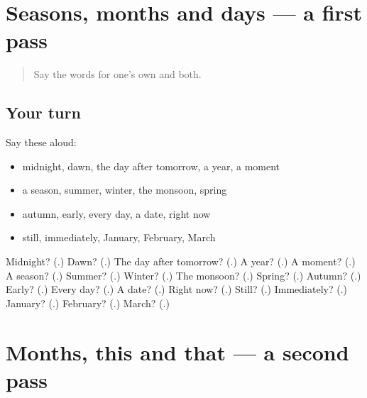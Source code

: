 \section[(dialogue)]{Seasons, months and days — a first pass}

\label{lesson:GU-R100-first-pass-seasons-months-and-days}



\begin{quote}
Say the words for one's own and both.
\end{quote}

\subsection*{Your turn}
Say these aloud:

\begin{itemize}
\raggedright
  \item midnight, dawn, the day after tomorrow, a year, a moment
  \item a season, summer, winter, the monsoon, spring
  \item autumn, early, every day, a date, right now
  \item still, immediately, January, February, March
\end{itemize}

\begin{tcolorbox}[breakable,colback=teal!4,colframe=teal!35!black,title={Before you move on}]
Midnight? (\textbf{}.) Dawn? (\textbf{}.) The day after tomorrow? (\textbf{}.) A year? (\textbf{}.) A moment? (\textbf{}.) A season? (\textbf{}.) Summer? (\textbf{}.) Winter? (\textbf{}.) The monsoon? (\textbf{}.) Spring? (\textbf{}.) Autumn? (\textbf{}.) Early? (\textbf{}.) Every day? (\textbf{}.) A date? (\textbf{}.) Right now? (\textbf{}.) Still? (\textbf{}.) Immediately? (\textbf{}.) January? (\textbf{}.) February? (\textbf{}.) March? (\textbf{}.)
\end{tcolorbox}
\section[(dialogue)]{Months, this and that — a second pass}

\label{lesson:GU-R100-second-pass-months-this-and-that}



